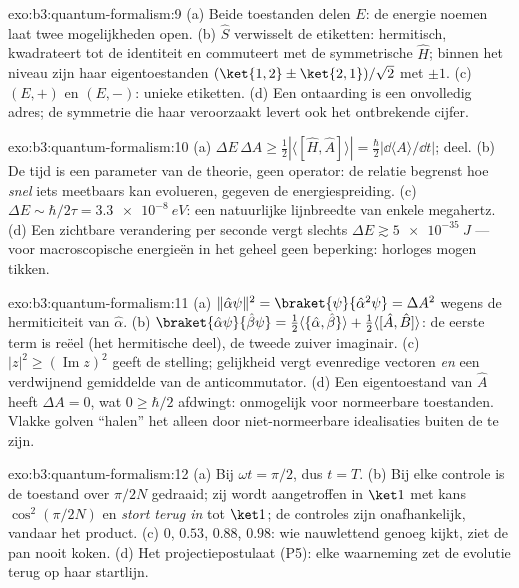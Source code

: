 \begin{solution}{exo:b3:quantum-formalism:9}
(a) Beide toestanden delen $E$: de energie noemen laat twee
mogelijkheden open. (b) $\hat S$ verwisselt de etiketten: hermitisch,
kwadrateert tot de identiteit en commuteert met de symmetrische $\hat H$;
binnen het niveau zijn haar eigentoestanden $(\ket{1,2} \pm \ket{2,1})/\sqrt2$ met  $\pm1$. (c) $(E, +)$ en $(E, -)$:
unieke etiketten. (d) Een ontaarding is een onvolledig adres; de
symmetrie die haar veroorzaakt levert ook het ontbrekende cijfer.
\end{solution}

\begin{solution}{exo:b3:quantum-formalism:10}
(a) $\Delta E\,\Delta A \ge \tfrac12|\langle[\hat H, \hat
A]\rangle| = \tfrac\hbar2|\dd\langle A\rangle/\dd t|$; deel. (b) De tijd
is een parameter van de theorie, geen operator: de relatie begrenst hoe
\emph{snel} iets meetbaars kan evolueren, gegeven de energiespreiding.
(c) $\Delta E \sim \hbar/2\tau = \qty{3.3e-8}{eV}$: een natuurlijke
lijnbreedte van enkele megahertz. (d) Een zichtbare verandering per
seconde vergt slechts $\Delta E \gtrsim \qty{5e-35}{J}$ --- voor
macroscopische energieën in het geheel geen beperking: horloges mogen
tikken.
\end{solution}

\begin{solution}{exo:b3:quantum-formalism:11}
(a) $\|\hat\alpha\psi\|^2 = \braket{\psi}{\hat\alpha^2\psi} =
\Delta A^2$ wegens de hermiticiteit van $\hat\alpha$. (b)
$\braket{\hat\alpha
\psi}{\hat\beta\psi} = \tfrac12\langle\{\hat\alpha,
\hat\beta\}\rangle + \tfrac12\langle[\hat A, \hat B]\rangle$: de eerste
term is reëel (het hermitische deel), de tweede zuiver imaginair.
(c) $|z|^2 \ge (\operatorname{Im}z)^2$ geeft de stelling; gelijkheid
vergt evenredige vectoren \emph{en} een verdwijnend gemiddelde van de
anticommutator. (d) Een eigentoestand van $\hat A$ heeft $\Delta A = 0$,
wat $0 \ge \hbar/2$ afdwingt: onmogelijk voor normeerbare toestanden.
Vlakke golven ``halen'' het alleen door niet-normeerbare idealisaties
buiten de  te zijn.
\end{solution}

\begin{solution}{exo:b3:quantum-formalism:12}
(a) Bij $\omega t = \pi/2$, dus $t = T$. (b) Bij elke controle is de
toestand over $\pi/2N$ gedraaid; zij wordt aangetroffen in $\ket1$ met
kans $\cos^2(\pi/2N)$ en \emph{stort terug in} tot $\ket1$; de controles
zijn onafhankelijk, vandaar het product. (c) $0$, $0.53$, $0.88$,
$0.98$: wie nauwlettend genoeg kijkt, ziet de pan nooit koken. (d) Het
projectiepostulaat (P5): elke waarneming zet de evolutie terug op haar
startlijn.
\end{solution}

